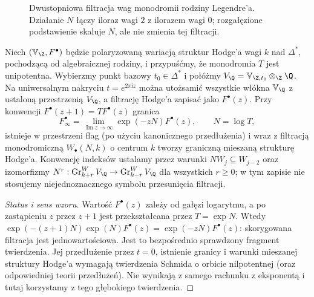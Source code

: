 \begin{figure}[!htbp]
\centering
{}
\caption{Dwustopniowa filtracja wag monodromii
rodziny Legendre'a. Działanie $N$ łączy
iloraz wagi $2$ z ilorazem wagi $0$;
rozgałęzione podstawienie skaluje $N$,
ale nie zmienia tej filtracji.}
\label{fig:xv-legendre-weight-explicit}
\end{figure}

\begin{twierdzenie}
\label{thm:xv-lmhs}
Niech $(\mathbb V_\Z,F^\bullet)$ będzie polaryzowaną
wariacją struktur Hodge'a wagi $k$ nad $\Delta^*$,
pochodzącą od algebraicznej rodziny, i przypuśćmy,
że monodromia $T$ jest unipotentna.
Wybierzmy punkt bazowy $t_0\in\Delta^*$ i połóżmy
$V_\Q=\mathbb V_{\Z,t_0}\otimes_{\Z}\Q$.
Na uniwersalnym nakryciu $t=e^{2\pi\mathrm iz}$
można utożsamić wszystkie włókna $\mathbb V_\Q$
z ustaloną przestrzenią $V_\Q$, a filtrację Hodge'a zapisać jako
$F^\bullet(z)$. Przy konwencji
$F^\bullet(z+1)=T F^\bullet(z)$ granica
\[
F^\bullet_\infty=\lim_{\operatorname{Im}z\to\infty}
\exp(-zN)F^\bullet(z),\qquad N=\log T,
\]
istnieje w przestrzeni flag (po użyciu kanonicznego
przedłużenia) i wraz z filtracją monodromiczną
$W_\bullet(N,k)$ o centrum $k$ tworzy graniczną
mieszaną strukturę Hodge'a. Konwencję indeksów
ustalamy przez warunki
$NW_j\subseteq W_{j-2}$ oraz izomorfizmy
$N^r:\operatorname{Gr}_{k+r}^{W}V_\Q
\to\operatorname{Gr}_{k-r}^{W}V_\Q$
dla wszystkich $r\ge0$; w tym zapisie nie
stosujemy niejednoznacznego symbolu przesunięcia filtracji.
\end{twierdzenie}
\begin{proof}[Status i sens wzoru]
Wartość $F^\bullet(z)$ zależy od gałęzi logarytmu,
a po zastąpieniu $z$ przez $z+1$ jest przekształcana
przez $T=\exp N$. Wtedy
$\exp(-(z+1)N)\exp(N)F^\bullet(z)
=\exp(-zN)F^\bullet(z)$: skorygowana filtracja
jest jednowartościowa. Jest to bezpośrednio sprawdzony
fragment twierdzenia. Jej przedłużenie przez $t=0$,
istnienie granicy i warunki mieszanej struktury Hodge'a
wymagają twierdzenia Schmida o orbicie nilpotentnej
(oraz odpowiedniej teorii przedłużeń). Nie wynikają
z samego rachunku z eksponentą i tutaj korzystamy
z tego głębokiego twierdzenia.
\end{proof}

